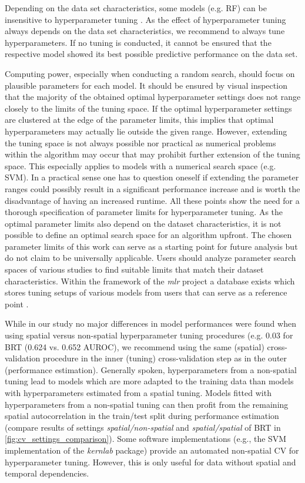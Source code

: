 \documentclass[review]{elsarticle}
\begin{document}
Depending on the data set characteristics, some models (e.g. \ac{RF}) can be insensitive to hyperparameter tuning \citep{Biau2016, Diaz2006}.
As the effect of hyperparameter tuning always depends on the data set characteristics, we recommend to always tune hyperparameters.
If no tuning is conducted, it cannot be ensured that the respective model showed its best possible predictive performance on the data set.

Computing power, especially when conducting a random search, should focus on plausible parameters for each model.
It should be ensured by visual inspection that the majority of the obtained optimal hyperparameter settings does not range closely to the limits of the tuning space.
If the optimal hyperparameter settings are clustered at the edge of the parameter limits, this implies that optimal hyperparameters may actually lie outside the given range.
However, extending the tuning space is not always possible nor practical as numerical problems within the algorithm may occur that may prohibit further extension of the tuning space.
This especially applies to models with a numerical search space (e.g. \ac{SVM}).
In a practical sense one has to question oneself if extending the parameter ranges could possibly result in a significant performance increase and is worth the disadvantage of having an increased runtime.
All these points show the need for a thorough specification of parameter limits for hyperparameter tuning.
As the optimal parameter limits also depend on the dataset characteristics, it is not possible to define an optimal search space for an algorithm upfront.
The chosen parameter limits of this work can serve as a starting point for future analysis but do not claim to be universally applicable.
Users should analyze parameter search spaces of various studies to find suitable limits that match their dataset characteristics.
Within the framework of the \textit{mlr} project a database exists which stores tuning setups of various models from users that can serve as a reference point \citep{mlrhyperopt}.

While in our study no major differences in model performances were found when using spatial versus non-spatial hyperparameter tuning procedures (e.g. 0.03 for \ac{BRT} (0.624 vs. 0.652 AUROC), we recommend using the same (spatial) cross-validation procedure in the inner (tuning) cross-validation step as in the outer (performance estimation).
Generally spoken, hyperparameters from a non-spatial tuning lead to models which are more adapted to the training data than models with hyperparameters estimated from a spatial tuning.
Models fitted with hyperparameters from a non-spatial tuning can then profit from the remaining spatial autocorrelation in the train/test split during performance estimation (compare results of settings \textit{spatial/non-spatial} and \textit{spatial/spatial} of BRT in \autoref{fig:cv_settings_comparison}).
Some software implementations (e.g., the SVM implementation of the \textit{kernlab} package) provide an automated non-spatial CV for hyperparameter tuning.
However, this is only useful for data without spatial and temporal dependencies.
\end{document}
